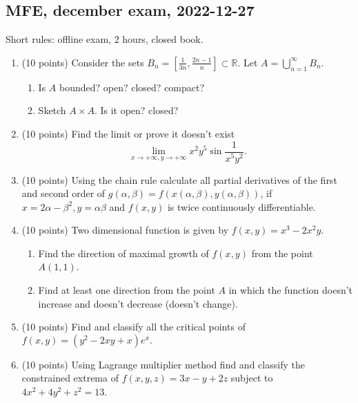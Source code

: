 \subsection{MFE, december exam, 2022-12-27}

Short rules: offline exam, 2 hours, closed book. 
\begin{enumerate}
      \item (10 points) Consider the sets $B_n=\left[ \frac{1}{3n},\frac{2n-1}{n}\right]\subset \mathbb{R}$. Let $A=\bigcup \limits_{n=1}^{\infty}B_n$.  
        \begin{enumerate}
            \item Is $A$ bounded? open? closed? compact?
            \item Sketch $A\times A$. Is it open? closed?
        \end{enumerate} 



    \item (10 points) Find the limit or prove it doesn't exist $$\lim\limits_{x\to +\infty, y\to +\infty}x^2y^5\sin {\frac{1}{x^5y^2}}.$$



    \item (10 points) Using the chain rule calculate all partial derivatives of the first and second order of $g(\alpha,\beta)=f(x(\alpha,\beta),y(\alpha,\beta))$, if $x=2\alpha-\beta^2, y=\alpha \beta$ and $f(x,y)$ is twice continuously differentiable. 



    \item (10 points) Two dimensional function is given by $f(x,y)=x^3-2x^2y$.
        \begin{enumerate} 
            \item Find the direction of maximal growth of $f(x,y)$ from the point $A(1,1)$.
            \item Find at least one direction from the point $A$ in which the function doesn't increase and doesn't decrease (doesn't change).
        \end{enumerate} 


    \item (10 points) Find and classify all the critical points of  $f(x,y)=(y^2-2xy+x)e^x.$


    \item (10 points) Using Lagrange multiplier method find and classify the constrained extrema of $f(x,y,z)=3x-y+2z$ subject to $4x^2+4y^2+z^2=13$.
\end{enumerate}

